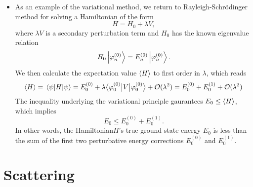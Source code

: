 \documentclass[11pt, a4paper]{article}
\newcommand{\Schro}{Schr\"{o}dinger\xspace}
\newcommand{\Ham}{Hamiltonian\xspace}
\newcommand{\bmel}[3]{\big \langle {#1} \big | {#2} \big | {#3} \big \rangle}  %
\begin{document}
\begin{itemize}
    \item As an example of the variational method, we return to Rayleigh-\Schro method for solving a \Ham of the form
    \begin{equation*}
        H = H_{0} + \lambda V,
    \end{equation*}
    where $ \lambda V $ is a secondary perturbation term and $ H_{0} $ has the known eigenvalue relation
    \begin{equation*}
        H_{0} \ket{\varphi_{n}^{(0)}} = E_{n}^{(0)}\ket{\varphi_{n}^{(0)}}.
    \end{equation*}
    We then calculate the expectation value $ \ev{H} $ to first order in $ \lambda $, which reads
    \begin{equation*}
        \ev{H} = \mel{\psi}{H}{\psi} = E_{0}^{(0)} + \lambda \bmel{\varphi_{0}^{(0)}}{V}{\varphi_{0}^{(0)}} + \mathcal{O}(\lambda^{2}) = E_{0}^{(0)} + E_{0}^{(1)} + \mathcal{O}(\lambda^{2})
    \end{equation*}
    The inequality underlying the variational principle gaurantees $ E_{0} \leq \ev{H} $, which implies
    \begin{equation*}
        E_{0} \leq E_{0}^{(0)} + E_{0}^{(1)}.
    \end{equation*}
    In other words, the \Ham $ H $'s true ground state energy $ E_{0} $ is less than the sum of the first two perturbative energy corrections $ E_{0}^{(0)} $ and $ E_{0}^{(1)} $.
    
\end{itemize}

\newpage
\section{Scattering}
\end{document}
